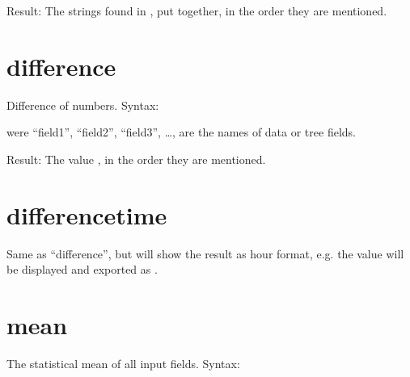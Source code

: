 \documentclass[letterpaper,10pt,english]{sphinxmanual}
\begin{document}
\sphinxAtStartPar
Result: The strings found in , put together, in the order they are mentioned.


\section{difference}
\label{\detokenize{tree-fields:difference}}
\sphinxAtStartPar
Difference of numbers.
Syntax:

\begin{sphinxVerbatim}[commandchars=\\\{\}]
 
     
     \PYG{p}{[}  \PYG{p}{]}
     \PYG{p}{[} \PYG{p}{]}
     \PYG{p}{[}\PYG{p}{]}
     \PYG{p}{[}\PYG{p}{]}
\end{sphinxVerbatim}

\sphinxAtStartPar
were “field1”, “field2”, “field3”, …, are the names of data or tree fields.

\sphinxAtStartPar
Result: The value , in the order they are mentioned.


\section{difference\sphinxhyphen{}time}
\label{\detokenize{tree-fields:difference-time}}
\sphinxAtStartPar
Same as “difference”, but will show the result as hour format, e.g. the value  will be displayed and exported as .


\section{mean}
\label{\detokenize{tree-fields:mean}}
\sphinxAtStartPar
The statistical mean of all input fields.
Syntax:
\end{document}

